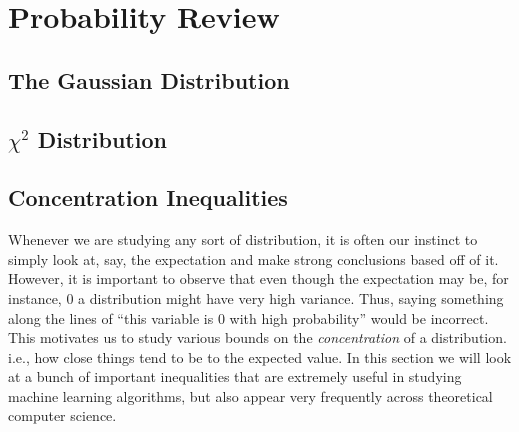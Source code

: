\section{Probability Review}
\subsection{The Gaussian Distribution}
\label{sec:prob:gaussian}
\subsection{$\chi^2$ Distribution}
\label{sec:prob:chi}
\subsection{Concentration Inequalities}
Whenever we are studying any sort of distribution, it is often our instinct to simply
look at, say, the expectation and make strong conclusions based off of it. However,
it is important to observe that even though the expectation may be, for instance, $0$
a distribution might have very high variance. Thus, saying something along the lines of
``this variable is $0$ with high probability'' would be incorrect. This motivates us to
study various bounds on the {\em concentration} of a distribution. i.e., how close things
tend to be to the expected value. In this section we will look at a bunch of important
inequalities that are extremely useful in studying machine learning algorithms, but also
appear very frequently across theoretical computer science.
\label{sec:prob:conc}
